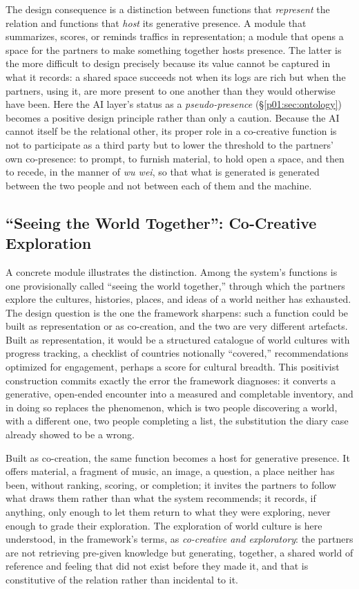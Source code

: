 \documentclass[11pt,a4paper]{article}
\begin{document}
The design consequence is a distinction between functions that \emph{represent} the relation and functions that \emph{host} its generative presence. A module that summarizes, scores, or reminds traffics in representation; a module that opens a space for the partners to make something together hosts presence. The latter is the more difficult to design precisely because its value cannot be captured in what it records: a shared space succeeds not when its logs are rich but when the partners, using it, are more present to one another than they would otherwise have been. Here the AI layer's status as a \emph{pseudo-presence} (§\ref{p01:sec:ontology}) becomes a positive design principle rather than only a caution. Because the AI cannot itself be the relational other, its proper role in a co-creative function is not to participate as a third party but to lower the threshold to the partners' own co-presence: to prompt, to furnish material, to hold open a space, and then to recede, in the manner of \emph{wu wei}, so that what is generated is generated between the two people and not between each of them and the machine.

\subsection{``Seeing the World Together'': Co-Creative Exploration}\label{p01:sec:seeingworld}

A concrete module illustrates the distinction. Among the system's functions is one provisionally called ``seeing the world together,'' through which the partners explore the cultures, histories, places, and ideas of a world neither has exhausted. The design question is the one the framework sharpens: such a function could be built as representation or as co-creation, and the two are very different artefacts. Built as representation, it would be a structured catalogue of world cultures with progress tracking, a checklist of countries notionally ``covered,'' recommendations optimized for engagement, perhaps a score for cultural breadth. This positivist construction commits exactly the error the framework diagnoses: it converts a generative, open-ended encounter into a measured and completable inventory, and in doing so replaces the phenomenon, which is two people discovering a world, with a different one, two people completing a list, the substitution the diary case already showed to be a wrong.

Built as co-creation, the same function becomes a host for generative presence. It offers material, a fragment of music, an image, a question, a place neither has been, without ranking, scoring, or completion; it invites the partners to follow what draws them rather than what the system recommends; it records, if anything, only enough to let them return to what they were exploring, never enough to grade their exploration. The exploration of world culture is here understood, in the framework's terms, as \emph{co-creative and exploratory}: the partners are not retrieving pre-given knowledge but generating, together, a shared world of reference and feeling that did not exist before they made it, and that is constitutive of the relation rather than incidental to it.
\end{document}
